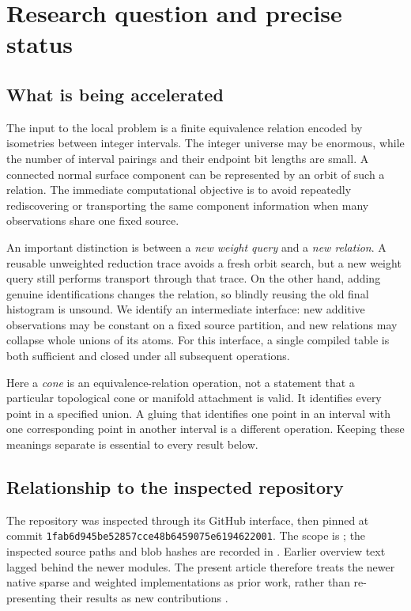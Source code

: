 \section{Research question and precise status}
\label{sec:context}

\subsection{What is being accelerated}

The input to the local problem is a finite equivalence relation encoded by
isometries between integer intervals. The integer universe may be enormous,
while the number of interval pairings and their endpoint bit lengths are
small. A connected normal surface component can be represented by an orbit
of such a relation. The immediate computational objective is to avoid
repeatedly rediscovering or transporting the same component information when
many observations share one fixed source.

An important distinction is between a \emph{new weight query} and a
\emph{new relation}. A reusable unweighted reduction trace avoids a fresh
orbit search, but a new weight query still performs transport through that
trace. On the other hand, adding genuine identifications changes the
relation, so blindly reusing the old final histogram is unsound. We identify
an intermediate interface: new additive observations may be constant on a
fixed source partition, and new relations may collapse whole unions of its
atoms. For this interface, a single compiled table is both sufficient and
closed under all subsequent operations.

Here a \emph{cone} is an equivalence-relation operation, not a statement that
a particular topological cone or manifold attachment is valid. It identifies
every point in a specified union. A gluing that identifies one point in an
interval with one corresponding point in another interval is a different
operation. Keeping these meanings separate is essential to every result
below.

\subsection{Relationship to the inspected repository}

The repository was inspected through its GitHub interface, then pinned at
commit
\nolinkurl{1fab6d945be52857cce48b6459075e6194622001}. The scope is
; the inspected source paths and blob hashes
are recorded in . Earlier overview text
lagged behind the newer modules. The present article therefore treats the
newer native sparse and weighted implementations as prior work, rather than
re-presenting their results as new contributions \cite{repo,sparserepo,weightedrepo}.

